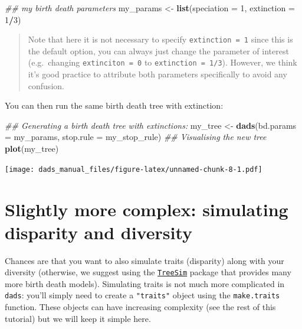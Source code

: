 \documentclass[]{book}
\newenvironment{Shaded}{\begin{snugshade}}{\end{snugshade}}
\newcommand{\CommentTok}[1]{\textcolor[rgb]{0.56,0.35,0.01}{\textit{#1}}}
\newcommand{\DataTypeTok}[1]{\textcolor[rgb]{0.13,0.29,0.53}{#1}}
\newcommand{\DecValTok}[1]{\textcolor[rgb]{0.00,0.00,0.81}{#1}}
\newcommand{\KeywordTok}[1]{\textcolor[rgb]{0.13,0.29,0.53}{\textbf{#1}}}
\newcommand{\NormalTok}[1]{#1}
\newcommand{\OperatorTok}[1]{\textcolor[rgb]{0.81,0.36,0.00}{\textbf{#1}}}
\newcommand{\StringTok}[1]{\textcolor[rgb]{0.31,0.60,0.02}{#1}}
\begin{document}
\begin{Shaded}
\begin{Highlighting}[]
\CommentTok{## my birth death parameters}
\NormalTok{my_params <-}\StringTok{ }\KeywordTok{list}\NormalTok{(}\DataTypeTok{speciation =} \DecValTok{1}\NormalTok{,}
                  \DataTypeTok{extinction =} \DecValTok{1}\OperatorTok{/}\DecValTok{3}\NormalTok{)}
\end{Highlighting}
\end{Shaded}

\begin{quote}
Note that here it is not necessary to specify \texttt{extinction\ =\ 1} since this is the default option, you can always just change the parameter of interest (e.g.~changing \texttt{extinciton\ =\ 0} to \texttt{extinction\ =\ 1/3}). However, we think it's good practice to attribute both parameters specifically to avoid any confusion.
\end{quote}

You can then run the same birth death tree with extinction:

\begin{Shaded}
\begin{Highlighting}[]
\CommentTok{## Generating a birth death tree with extinctions:}
\NormalTok{my_tree <-}\StringTok{ }\KeywordTok{dads}\NormalTok{(}\DataTypeTok{bd.params =}\NormalTok{ my_params, }\DataTypeTok{stop.rule =}\NormalTok{ my_stop_rule)}
\CommentTok{## Visualising the new tree}
\KeywordTok{plot}\NormalTok{(my_tree)}
\end{Highlighting}
\end{Shaded}

\texttt{[image: dads\_manual\_files/figure-latex/unnamed-chunk-8-1.pdf]}

\hypertarget{slightly-more-complex-simulating-disparity-and-diversity}{%
\section{Slightly more complex: simulating disparity and diversity}\label{slightly-more-complex-simulating-disparity-and-diversity}}

Chances are that you want to also simulate traits (disparity) along with your diversity (otherwise, we suggest using the \href{https://github.com/tanja819/TreeSim/}{\texttt{TreeSim}} package that provides many more birth death models).
Simulating traits is not much more complicated in \texttt{dads}: you'll simply need to create a \texttt{"traits"} object using the \texttt{make.traits} function.
These objects can have increasing complexity (see the rest of this tutorial) but we will keep it simple here.
\end{document}
